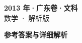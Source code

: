 \documentclass[zihao=-4, a4paper]{ctexart}
\begin{document}
\begin{center}
  {\Large\bfseries 2013 年·广东卷·文科}\\[4pt]
  {\large 数学 · 解析版}
\end{center}
\medskip
{}

\clearpage
{}
\begin{center}{\Large\bfseries 参考答案与详细解析}\end{center}
\medskip

\end{document}
